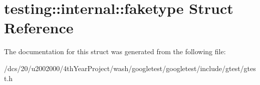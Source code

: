 \hypertarget{structtesting_1_1internal_1_1faketype}{}\section{testing\+:\+:internal\+:\+:faketype Struct Reference}
\label{structtesting_1_1internal_1_1faketype}


The documentation for this struct was generated from the following file\+:\begin{DoxyCompactItemize}
\item 
/dcs/20/u2002000/4th\+Year\+Project/wash/googletest/googletest/include/gtest/gtest.\+h\end{DoxyCompactItemize}

